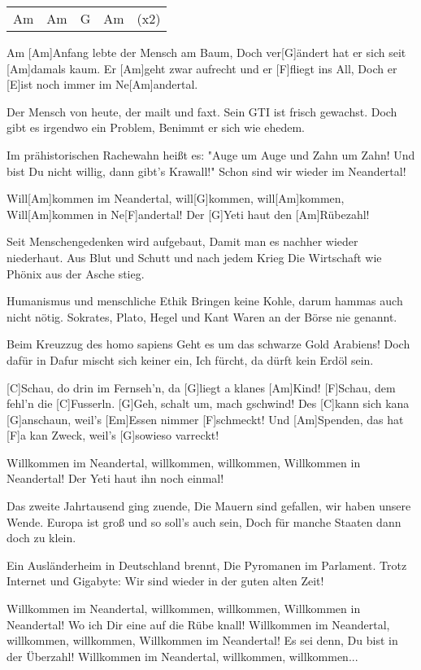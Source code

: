 

\begin{guitar}
	{\footnotesize\begin{tabular}{l|l|l|l l}
			Am & Am & G & Am & (x2)
	\end{tabular}}
	
	Am [Am]Anfang lebte der Mensch am Baum, 
	Doch ver[G]{ä}ndert hat er sich seit [Am]damals kaum.
	Er [Am]geht zwar aufrecht und er [F]fliegt ins All,
	Doch er [E]ist noch immer im Ne[Am]andertal.
	
	Der Mensch von heute, der mailt und faxt.
	Sein GTI ist frisch gewachst.
	Doch gibt es irgendwo ein Problem,
	Benimmt er sich wie ehedem.
	
	Im prähistorischen Rachewahn heißt es: 
	"Auge um Auge und Zahn um Zahn!
	Und bist Du nicht willig, dann gibt’s Krawall!"
	Schon sind wir wieder im Neandertal!
	
	Will[Am]kommen im Neandertal, will[G]kommen, will[Am]kommen,
	Will[Am]kommen in Ne[F]andertal! Der [G]Yeti haut den [Am]Rübezahl!
	
	Seit Menschengedenken wird aufgebaut,
	Damit man es nachher wieder niederhaut.
	Aus Blut und Schutt und nach jedem Krieg
	Die Wirtschaft wie Phönix aus der Asche stieg.
	
	Humanismus und menschliche Ethik 
	Bringen keine Kohle, darum hammas auch nicht nötig.
	Sokrates, Plato, Hegel und Kant
	Waren an der Börse nie genannt.
	
	Beim Kreuzzug des homo sapiens 
	Geht es um das schwarze Gold Arabiens!
	Doch dafür in Dafur mischt sich keiner ein,
	Ich fürcht, da dürft kein Erdöl sein.
	\pagebreak
	 
	
	[C]Schau, do drin im Fernseh’n, da [G]liegt a klanes [Am]Kind!
	[F]Schau, dem fehl’n die [C]Fusserln. [G]Geh, schalt um, mach gschwind!
	Des [C]kann sich kana [G]anschaun, weil’s [Em]Essen nimmer [F]schmeckt!
	Und [Am]Spenden, das hat [F]a kan Zweck, weil’s [G]sowieso varreckt!
	
	Willkommen im Neandertal, willkommen, willkommen,
	Willkommen in Neandertal! Der Yeti haut ihn noch einmal!
	
	Das zweite Jahrtausend ging zuende,
	Die Mauern sind gefallen, wir haben unsere Wende.
	Europa ist groß und so soll’s auch sein,
	Doch für manche Staaten dann doch zu klein.
	
	Ein Ausländerheim in Deutschland brennt,
	Die Pyromanen im Parlament.
	Trotz Internet und Gigabyte: 
	Wir sind wieder in der guten alten Zeit!
	
	Willkommen im Neandertal, willkommen, willkommen,
	Willkommen in Neandertal! Wo ich Dir eine auf die Rübe knall!
	Willkommen im Neandertal, willkommen, willkommen,
	Willkommen im Neandertal! Es sei denn, Du bist in der Überzahl!
	Willkommen im Neandertal, willkommen, willkommen...
\end{guitar}